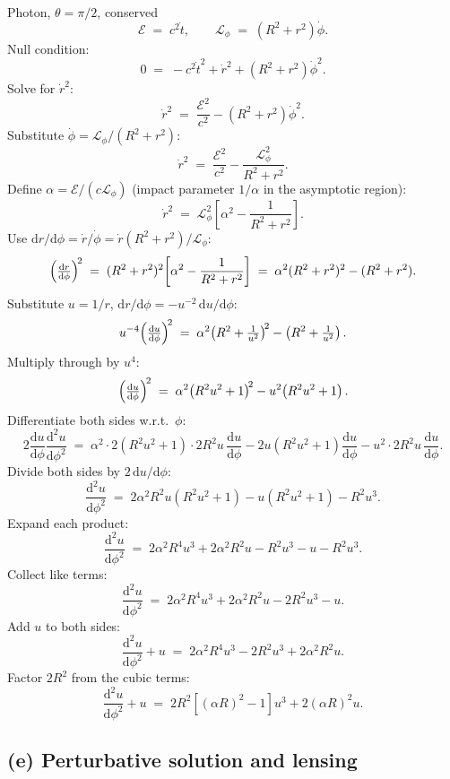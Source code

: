 \documentclass[11pt]{article}
\newcommand{\de}{\mathrm{d}}
\begin{document}
Photon, $\theta=\pi/2$, conserved
\[
\mathcal E \;=\; c^2\dot t,\qquad \mathcal L_\phi \;=\; (R^2+r^2)\dot\phi.
\]
Null condition:
\[
0 \;=\; -c^2\dot t^2 + \dot r^2 + (R^2+r^2)\dot\phi^2.
\]
Solve for $\dot r^2$:
\[
\dot r^2 \;=\; \frac{\mathcal E^2}{c^2} - (R^2+r^2)\dot\phi^2.
\]
Substitute $\dot\phi=\mathcal L_\phi/(R^2+r^2)$:
\[
\dot r^2 \;=\; \frac{\mathcal E^2}{c^2} - \frac{\mathcal L_\phi^2}{R^2+r^2}.
\]
Define $\alpha=\mathcal E/(c\mathcal L_\phi)$ (impact parameter $1/\alpha$ in the asymptotic region):
\[
\dot r^2 \;=\; \mathcal L_\phi^2\!\left[\alpha^2 - \frac{1}{R^2+r^2}\right].
\]
Use $\de r/\de\phi=\dot r/\dot\phi=\dot r(R^2+r^2)/\mathcal L_\phi$:
\[
\Bigl(\tfrac{\de r}{\de\phi}\Bigr)^{\!2} \;=\; (R^2+r^2)^2\!\left[\alpha^2 - \frac{1}{R^2+r^2}\right] \;=\; \alpha^2(R^2+r^2)^2 - (R^2+r^2).
\]
Substitute $u=1/r$, $\de r/\de\phi=-u^{-2}\,\de u/\de\phi$:
\[
u^{-4}\Bigl(\tfrac{\de u}{\de\phi}\Bigr)^{\!2} \;=\; \alpha^2\!\left(R^2+\tfrac{1}{u^2}\right)^{\!2} - \left(R^2+\tfrac{1}{u^2}\right).
\]
Multiply through by $u^4$:
\[
\Bigl(\tfrac{\de u}{\de\phi}\Bigr)^{\!2} \;=\; \alpha^2\!\left(R^2 u^2+1\right)^{\!2} - u^2\!\left(R^2 u^2+1\right).
\]
Differentiate both sides w.r.t.\ $\phi$:
\[
2\frac{\de u}{\de\phi}\frac{\de^2 u}{\de\phi^2} \;=\; \alpha^2\cdot 2(R^2 u^2+1)\cdot 2R^2 u\,\frac{\de u}{\de\phi} - 2u(R^2 u^2+1)\frac{\de u}{\de\phi} - u^2\cdot 2R^2 u\,\frac{\de u}{\de\phi}.
\]
Divide both sides by $2\,\de u/\de\phi$:
\[
\frac{\de^2 u}{\de\phi^2} \;=\; 2\alpha^2 R^2 u(R^2 u^2+1) - u(R^2 u^2+1) - R^2 u^3.
\]
Expand each product:
\[
\frac{\de^2 u}{\de\phi^2} \;=\; 2\alpha^2 R^4 u^3 + 2\alpha^2 R^2 u - R^2 u^3 - u - R^2 u^3.
\]
Collect like terms:
\[
\frac{\de^2 u}{\de\phi^2} \;=\; 2\alpha^2 R^4 u^3 + 2\alpha^2 R^2 u - 2R^2 u^3 - u.
\]
Add $u$ to both sides:
\[
\frac{\de^2 u}{\de\phi^2} + u \;=\; 2\alpha^2 R^4 u^3 - 2R^2 u^3 + 2\alpha^2 R^2 u.
\]
Factor $2R^2$ from the cubic terms:
\begin{equation}
\boxed{\;\frac{\de^2 u}{\de\phi^2}+u \;=\; 2R^2\!\left[(\alpha R)^2-1\right]u^3 + 2(\alpha R)^2 u.\;}
\label{eq:orbitu}
\end{equation}

\subsection*{(e) Perturbative solution and lensing}
\end{document}
